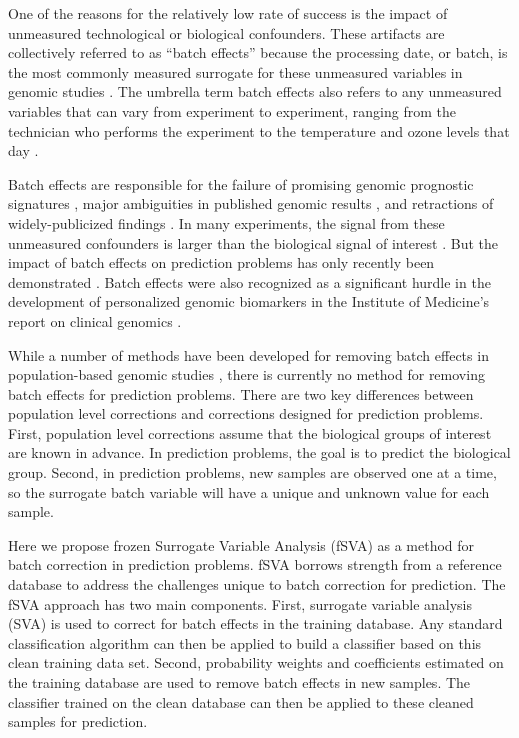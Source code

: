 \documentclass{bioinfo}\usepackage{graphicx, color}
\begin{document}
One of the reasons for the relatively low rate of success is the impact of unmeasured technological or biological confounders. These artifacts are collectively referred to as ``batch effects'' because the processing date, or batch, is the most commonly measured surrogate for these unmeasured variables in genomic studies \citep{Scharpf2011,Johnson2007b,Walker2008}. The umbrella term batch effects also refers to any unmeasured variables that can vary from experiment to experiment, ranging from the technician who performs the experiment to the temperature and ozone levels that day \citep{Lander1999,Fare2003}. 

Batch effects are responsible for the failure of promising genomic prognostic signatures \citep{Baggerly2004a,Baggerly2005}, major ambiguities in published genomic results \citep{Spielman2007,Akey2007}, and retractions of widely-publicized findings \citep{Sebastiani2010,Lambert2012}. In many experiments, the signal from these unmeasured confounders is larger than the biological signal of interest \citep{Leek2010}. But the impact of batch effects on prediction problems has only recently been demonstrated \citep{Parker2012,Luo2010}. Batch effects were also recognized as a significant hurdle in the development of personalized genomic biomarkers in the Institute of Medicine's report on clinical genomics \citep{Micheel2012}. 

While a number of methods have been developed for removing batch effects in population-based genomic studies \citep{Johnson2007b,Gagnon-Bartsch2011,Leek2007,Leek2010,Walker2008}, there is currently no method for removing batch effects for prediction problems. There are two key differences between population level corrections and corrections designed for prediction problems. First, population level corrections assume that the biological groups of interest are known in advance. In prediction problems, the goal is to predict the biological group. Second, in prediction problems, new samples are observed one at a time, so the surrogate batch variable will have a unique and unknown value for each sample. 

Here we propose frozen Surrogate Variable Analysis (fSVA) as a method for batch correction in prediction problems. fSVA borrows strength from a reference database to address the challenges unique to batch correction for prediction. The fSVA approach has two main components. First, surrogate variable analysis (SVA) is used to correct for batch effects in the training database. Any standard classification algorithm can then be applied to build a classifier based on this clean training data set. Second, probability weights and coefficients estimated on the training database are used to remove batch effects in new samples. The classifier trained on the clean database can then be applied to these cleaned samples for prediction. 
\end{document}
